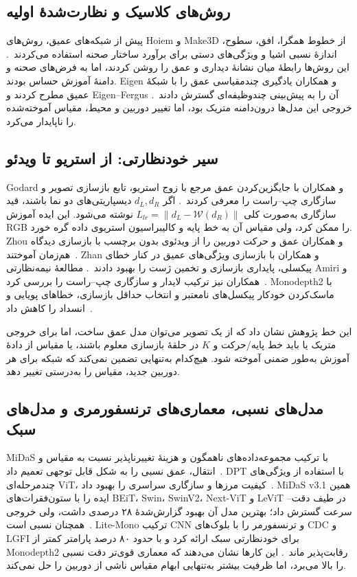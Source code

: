 \subsection{روش‌های کلاسیک و نظارت‌شدهٔ اولیه}
پیش از شبکه‌های عمیق، روش‌های Hoiem و Make3D از خطوط همگرا، افق، سطوح، اندازهٔ نسبی اشیا و ویژگی‌های دستی برای برآورد ساختار صحنه استفاده می‌کردند~\cite{Hoiem2005GeometricContext,Saxena2009Make3D}. این روش‌ها رابطهٔ میان نشانهٔ دیداری و عمق را روشن کردند، اما به فرض‌های صحنه و دامنهٔ آموزش حساس بودند. Eigen و همکاران یادگیری چندمقیاسی عمق را با شبکهٔ عمیق مطرح کردند و Eigen--Fergus آن را به پیش‌بینی چندوظیفه‌ای گسترش دادند~\cite{Eigen2014Depth,Eigen2015Predicting}. خروجی این مدل‌ها درون‌دامنه متریک بود، اما تغییر دوربین و محیط، مقیاس آموخته‌شده را ناپایدار می‌کرد.

\subsection{سیر خودنظارتی: از استریو تا ویدئو}
Godard و همکاران با جایگزین‌کردن عمق مرجع با زوج استریو، تابع بازسازی تصویر و سازگاری چپ--راست را معرفی کردند~\cite{Godard2017Unsupervised}. اگر $d_L,d_R$ دیسپاریتی‌های دو نما باشند، قید سازگاری به‌صورت کلی $L_{lr}=\lVert d_L-\mathcal W(d_R)\rVert$ نوشته می‌شود. این ایده آموزش RGB را ممکن کرد، ولی مقیاس آن به خط پایه و کالیبراسیون استریوی داده گره خورد.
Zhou و همکاران عمق و حرکت دوربین را از ویدئوی بدون برچسب با بازسازی دیدگاه هم‌زمان آموختند~\cite{Zhou2017Unsupervised}. Zhan و همکاران با بازسازی ویژگی‌های عمیق در کنار خطای پیکسلی، پایداری بازسازی و تخمین ژست را بهبود دادند~\cite{Zhan2018DeepFeatureReconstruction}. مطالعهٔ نیمه‌نظارتی Amiri و همکاران نیز ترکیب لایدار و سازگاری چپ--راست را بررسی کرد~\cite{Amiri2019SemiSupervised}. Monodepth2 با ماسک‌کردن خودکار پیکسل‌های نامعتبر و انتخاب حداقل بازسازی، خطاهای پویایی و انسداد را کاهش داد~\cite{Godard2019Digging}.

این خط پژوهش نشان داد که از یک تصویر می‌توان مدل عمق ساخت، اما برای خروجی متریک یا باید خط پایه/حرکت و $K$ در حلقهٔ بازسازی معلوم باشند، یا مقیاس از دادهٔ آموزش به‌طور ضمنی آموخته شود. هیچ‌کدام به‌تنهایی تضمین نمی‌کند که شبکه برای هر دوربین جدید، مقیاس را به‌درستی تغییر دهد.

\subsection{مدل‌های نسبی، معماری‌های ترنسفورمری و مدل‌های سبک}
MiDaS با ترکیب مجموعه‌داده‌های ناهمگون و هزینهٔ تغییرناپذیر نسبت به مقیاس و انتقال، عمق نسبی را به شکل قابل توجهی تعمیم داد~\cite{Ranftl2019Robust}. DPT با استفاده از ویژگی‌های چندمرحله‌ای ViT، کیفیت مرزها و سازگاری سراسری را بهبود داد~\cite{Ranftl2021DPT}. MiDaS v3.1 همین ایده را با ستون‌فقرات‌های BEiT، Swin، SwinV2، Next-ViT و LeViT در طیف دقت--سرعت گسترش داد؛ بهترین مدل آن بهبود گزارش‌شدهٔ ۲۸ درصدی داشت، ولی خروجی همچنان نسبی است~\cite{MiDaSV31}.
Lite-Mono ترکیب CNN و ترنسفورمر را با بلوک‌های CDC و LGFI برای خودنظارتی سبک ارائه کرد و با حدود ۸۰ درصد پارامتر کمتر از Monodepth2 رقابت‌پذیر ماند~\cite{LiteMono}. این کارها نشان می‌دهند که معماری قوی‌تر دقت نسبی را بالا می‌برد، اما ظرفیت بیشتر به‌تنهایی ابهام مقیاس ناشی از دوربین را حل نمی‌کند.

